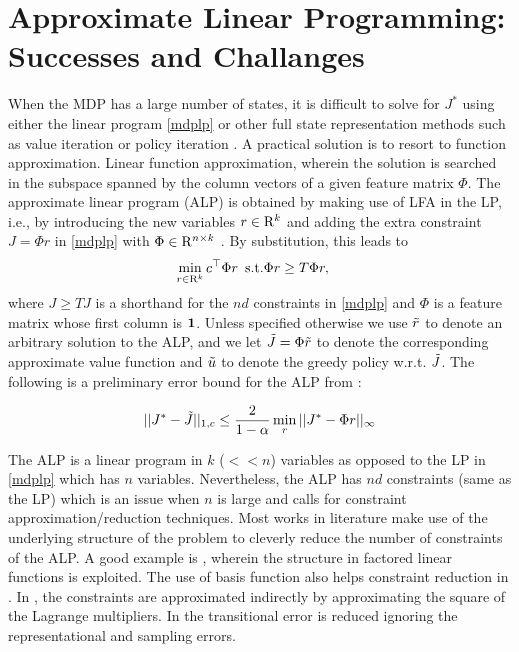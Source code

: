 \section{Approximate Linear Programming: Successes and Challanges}
When the MDP has a large number of states, it is difficult to solve for $J^*$ using either the linear program \eqref{mdplp} or other full state representation methods such as value iteration or policy iteration \cite{BertB}. A practical solution is to resort to function approximation. Linear function approximation, wherein the solution is searched in the subspace spanned by the column vectors of a given feature matrix $\Phi$.
The approximate linear program (ALP) is obtained by making use of LFA in the LP, i.e., by introducing the new variables $r\in \mathrm{R}^k$ and adding the extra constraint $J=\Phi r$ in \eqref{mdplp} with $\Phi \in \mathrm{R}^{n\times k}$ \citep{SchSei85}.
By substitution, this leads to
\begin{align}\label{alp}
\begin{split}
\min_{r\in \R^k}\, &c^\top \Phi r\,\,\,
\text{s.t.}\mb \Phi r\geq T \Phi r,
\end{split}
\end{align}
where $J\geq TJ$ is a shorthand for the $nd$ constraints in \eqref{mdplp} and $\Phi$ is a feature matrix whose first column is $\mathbf{1}$. Unless specified otherwise we use $\tilde{r}$ to denote an arbitrary solution to the ALP, and we let $\tilde{J}=\Phi \tilde{r}$ to denote the corresponding approximate value function and $\tilde{u}$ to denote the greedy policy w.r.t. $\tilde{J}$.
The following is a preliminary error bound for the ALP from \cite{ALP}:
\begin{theorem}
\begin{align*}
||J^*-\tilde{J}||_{1,c}\leq \frac{2}{1-\alpha}\min_{r}||J^*-\Phi r||_\infty
\end{align*}
\end{theorem}
The ALP is a linear program in $k$ ($<<n$) variables as opposed to the LP in \eqref{mdplp} which has $n$ variables. Nevertheless, the ALP has $nd$ constraints (same as the LP) which is an issue when $n$ is large and calls for constraint approximation/reduction techniques. Most works in literature make use of the underlying structure of the problem to cleverly reduce the number of constraints of the ALP. A good example is \cite{gkp}, wherein the structure in factored linear functions is exploited. The use of basis function also helps constraint reduction in \cite{Mor-Kum}. In \cite{ALP-Bor}, the constraints are approximated indirectly by approximating the square of the Lagrange multipliers. In \cite{petrik} the transitional error is reduced ignoring the representational and sampling errors.\par
